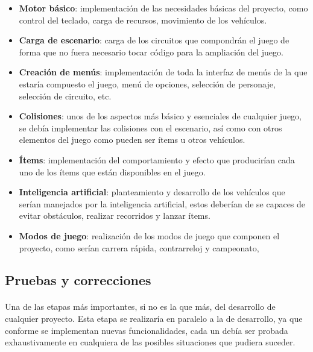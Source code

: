 \documentclass[a4paper,11pt]{article} %
\begin{document}
\begin{itemize}
    \item \textbf{Motor básico}: implementación de las necesidades básicas del proyecto, como control del teclado, carga de recursos, movimiento
    de los vehículos.
    
    
    \item \textbf{Carga de escenario}: carga de los circuitos que compondrán el juego de forma que no fuera necesario tocar código
    para la ampliación del juego.
    
    \item \textbf{Creación de menús}: implementación de toda la interfaz de menús de la que estaría compuesto el juego, menú de 
    opciones, selección de personaje, selección de circuito, etc.
    
    \item \textbf{Colisiones}: unos de los aspectos más básico y esenciales de cualquier juego, se debía implementar las colisiones con el
    escenario, así como con otros elementos del juego como pueden ser ítems u otros vehículos.
    
    \item \textbf{Ítems}: implementación del comportamiento y efecto que
    producirían cada uno de los ítems que están disponibles en el juego.
    
    \item \textbf{Inteligencia artificial}: planteamiento y desarrollo de los vehículos que serían manejados por la inteligencia 
    artificial, estos deberían de se capaces de evitar obstáculos, realizar
    recorridos y lanzar ítems.
    
    \item \textbf{Modos de juego}: realización de los modos de juego que componen el proyecto, como serían carrera rápida, contrarreloj
    y campeonato,
\end{itemize}

\subsection{Pruebas y correcciones}

\paragraph{}
Una de las etapas más importantes, si no es la que más, del desarrollo de cualquier proyecto. Esta etapa se realizaría en paralelo
a la de desarrollo, ya que conforme se implementan nuevas funcionalidades, cada
un debía ser probada exhaustivamente en cualquiera
de las posibles situaciones que pudiera suceder.
\end{document}
